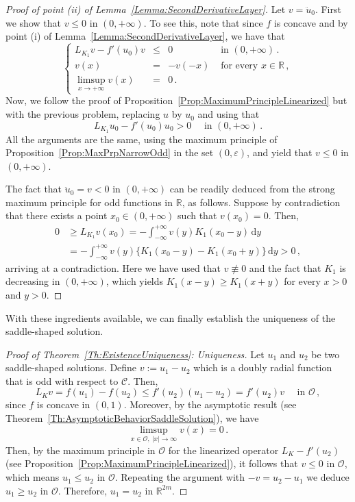 \documentclass[12pt,reqno]{amsart}
\theoremstyle{definition}
\theoremstyle{remark}
\newcommand{\con}[1]{\mathbb{#1}}
\newcommand{\R}{\con{R}} %
\newcommand{\ccal}{\mathscr{C}}
\newcommand{\ocal}{\mathcal{O}}
\renewcommand{\d}{\,\mathrm{d}} %
\newcommand\beqc[1]{\left\{\begin{array}{#1}}
\newcommand\eeqc{\end{array} \right.}
\def\PDEsystem{rcll}
\def\ds{\displaystyle}
\numberwithin{equation}{section}
\begin{document}
\begin{proof}[Proof of point (ii) of Lemma~\ref{Lemma:SecondDerivativeLayer}]
	
	Let $v = \ddot{u}_0$. First we show that $v\leq 0$ in $(0,+\infty)$. To see this, note that since $f$ is concave and by point (i) of Lemma~\ref{Lemma:SecondDerivativeLayer}, we have that
	$$
	\beqc{\PDEsystem}
	L_{K_1} v - f'(u_0)v &\leq &0 & \text{ in } (0,+\infty)\,.\\
	v(x) &= &-v(-x) & \text{ for every } x\in \R\,,\\
	\ds \limsup_{x\to +\infty} v(x) &= & 0\,.
	\eeqc
	$$
	Now, we follow the proof of Proposition~\ref{Prop:MaximumPrincipleLinearized} but with the previous problem, replacing $u$ by $u_0$ and using that
	$$
	L_{K_1} u_0 - f'(u_0)u_0 > 0 \quad \text{ in } (0,+\infty)\,. 
	$$
	All the arguments are the same, using the maximum principle of Proposition~\ref{Prop:MaxPrpNarrowOdd} in the set $(0,\varepsilon)$, and yield that $v\leq 0$ in $(0,+\infty)$.
	
	The fact that $\ddot{u}_0 = v < 0$ in $(0,+\infty)$ can be readily deduced from the strong maximum principle for odd functions in $\R$, as follows. Suppose by contradiction that there exists a point $x_0\in (0,+\infty)$ such that $v(x_0) = 0$. Then,
	\begin{align*}
	0 &\geq L_{K_1} v (x_0) = - \int_{-\infty}^{+\infty}	v(y) K_1(x_0 - y) \d y \\
	&= - \int_{-\infty}^{+\infty} v(y) \{ K_1(x_0 - y) - K_1(x_0 + y)\} \d y > 0\,,
	\end{align*}
	arriving at a contradiction. Here we have used that $v\not \equiv 0$ and the fact that $K_1$ is decreasing in $(0,+\infty)$, which yields $K_1(x - y) \geq  K_1(x + y)$ for every $x>0$ and $y>0$.
\end{proof}






With these ingredients available, we can finally establish the uniqueness of the saddle-shaped solution.



\begin{proof}[Proof of Theorem~\ref{Th:ExistenceUniqueness}: Uniqueness]
	Let $u_1$ and $u_2$ be two saddle-shaped solutions. Define $v := u_1 - u_2$ which is a doubly radial function that is odd with respect to $\ccal$. Then,
	$$
	L_K v = f(u_1) - f(u_2) \leq f'(u_2) (u_1 - u_2) = f'(u_2) v \quad \textrm{ in } \ocal\,,
	$$
	since $f$ is concave in $(0,1)$. Moreover, by the asymptotic result (see Theorem~\ref{Th:AsymptoticBehaviorSaddleSolution}), we have
	$$
	\limsup_{x\in \ocal, \ |x|\to \infty} v(x) = 0\,.
	$$
	Then, by the maximum principle in $\ocal$ for the linearized operator $L_K  - f'(u_2)$ (see Proposition~\ref{Prop:MaximumPrincipleLinearized}), it follows that $v \leq 0$ in $\ocal$, which means $u_1 \leq u_2$ in $\ocal$. Repeating the  argument with $-v = u_2 - u_1$ we deduce $u_1 \geq u_2$ in $\ocal$. Therefore, $u_1 = u_2$ in $\R^{2m}$.
\end{proof}
\end{document}
